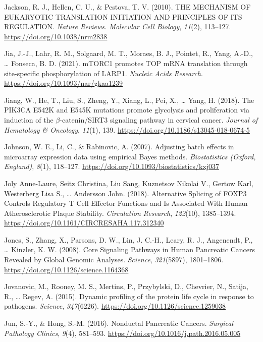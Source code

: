 \documentclass[12pt,openany]{book}
\begin{document}
\hypertarget{ref-Jackson2010a}{}
Jackson, R. J., Hellen, C. U., \& Pestova, T. V. (2010). THE MECHANISM
OF EUKARYOTIC TRANSLATION INITIATION AND PRINCIPLES OF ITS REGULATION.
\emph{Nature Reviews. Molecular Cell Biology}, \emph{11}(2), 113--127.
\url{https://doi.org/10.1038/nrm2838}

\hypertarget{ref-Jia2021}{}
Jia, J.-J., Lahr, R. M., Solgaard, M. T., Moraes, B. J., Pointet, R.,
Yang, A.-D., \ldots{} Fonseca, B. D. (2021). mTORC1 promotes TOP mRNA
translation through site-specific phosphorylation of LARP1.
\emph{Nucleic Acids Research}.
\url{https://doi.org/10.1093/nar/gkaa1239}

\hypertarget{ref-Jiang2018}{}
Jiang, W., He, T., Liu, S., Zheng, Y., Xiang, L., Pei, X., \ldots{}
Yang, H. (2018). The PIK3CA E542K and E545K mutations promote glycolysis
and proliferation via induction of the \(\beta\)-catenin/SIRT3 signaling
pathway in cervical cancer. \emph{Journal of Hematology \& Oncology},
\emph{11}(1), 139. \url{https://doi.org/10.1186/s13045-018-0674-5}

\hypertarget{ref-Johnson2007}{}
Johnson, W. E., Li, C., \& Rabinovic, A. (2007). Adjusting batch effects
in microarray expression data using empirical Bayes methods.
\emph{Biostatistics (Oxford, England)}, \emph{8}(1), 118--127.
\url{https://doi.org/10.1093/biostatistics/kxj037}

\hypertarget{ref-JolyAnne-Laure2018}{}
Joly Anne-Laure, Seitz Christina, Liu Sang, Kuznetsov Nikolai V., Gertow
Karl, Westerberg Lisa S., \ldots{} Andersson John. (2018). Alternative
Splicing of FOXP3 Controls Regulatory T Cell Effector Functions and Is
Associated With Human Atherosclerotic Plaque Stability.
\emph{Circulation Research}, \emph{122}(10), 1385--1394.
\url{https://doi.org/10.1161/CIRCRESAHA.117.312340}

\hypertarget{ref-Jones2008}{}
Jones, S., Zhang, X., Parsons, D. W., Lin, J. C.-H., Leary, R. J.,
Angenendt, P., \ldots{} Kinzler, K. W. (2008). Core Signaling Pathways
in Human Pancreatic Cancers Revealed by Global Genomic Analyses.
\emph{Science}, \emph{321}(5897), 1801--1806.
\url{https://doi.org/10.1126/science.1164368}

\hypertarget{ref-Jovanovic2015}{}
Jovanovic, M., Rooney, M. S., Mertins, P., Przybylski, D., Chevrier, N.,
Satija, R., \ldots{} Regev, A. (2015). Dynamic profiling of the protein
life cycle in response to pathogens. \emph{Science}, \emph{347}(6226).
\url{https://doi.org/10.1126/science.1259038}

\hypertarget{ref-Jun2016}{}
Jun, S.-Y., \& Hong, S.-M. (2016). Nonductal Pancreatic Cancers.
\emph{Surgical Pathology Clinics}, \emph{9}(4), 581--593.
\url{https://doi.org/10.1016/j.path.2016.05.005}
\end{document}
